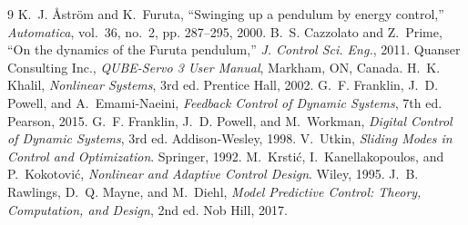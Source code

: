 \documentclass[conference]{IEEEtran}
\begin{document}

\begin{thebibliography}{9}
 K.~J. \AA str\"om and K.~Furuta, ``Swinging up a pendulum by energy control,'' \emph{Automatica}, vol.~36, no.~2, pp. 287--295, 2000.
 B.~S. Cazzolato and Z.~Prime, ``On the dynamics of the Furuta pendulum,'' \emph{J. Control Sci. Eng.}, 2011.
 Quanser Consulting Inc., \emph{QUBE-Servo 3 User Manual}, Markham, ON, Canada.
 H.~K. Khalil, \emph{Nonlinear Systems}, 3rd ed. Prentice Hall, 2002.
 G.~F. Franklin, J.~D. Powell, and A.~Emami-Naeini, \emph{Feedback Control of Dynamic Systems}, 7th ed. Pearson, 2015.
 G.~F. Franklin, J.~D. Powell, and M.~Workman, \emph{Digital Control of Dynamic Systems}, 3rd ed. Addison-Wesley, 1998.
 V.~Utkin, \emph{Sliding Modes in Control and Optimization}. Springer, 1992.
 M.~Krsti\'c, I.~Kanellakopoulos, and P.~Kokotovi\'c, \emph{Nonlinear and Adaptive Control Design}. Wiley, 1995.
 J.~B. Rawlings, D.~Q. Mayne, and M.~Diehl, \emph{Model Predictive Control: Theory, Computation, and Design}, 2nd ed. Nob Hill, 2017.
\end{thebibliography}
\end{document}
